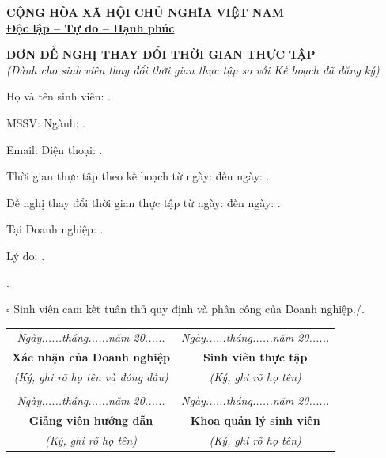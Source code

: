 \documentclass[12pt]{article}
\newcommand{\densedotfill}{\leavevmode\cleaders\hbox{.\hspace{1.5pt}}\hfill\kern0pt}
\begin{document}
\begin{flushright}
\end{flushright}

\vspace{-1.5cm}
\begin{center}
\textbf{CỘNG HÒA XÃ HỘI CHỦ NGHĨA VIỆT NAM}\\
\textbf{\underline{Độc lập – Tự do – Hạnh phúc}}\\
\vspace{0.2cm}
\end{center}

\vspace{1cm}

\begin{center}
\textbf{\Large ĐƠN ĐỀ NGHỊ THAY ĐỔI THỜI GIAN THỰC TẬP}\\
\textit{(Dành cho sinh viên thay đổi thời gian thực tập so với Kế hoạch đã đăng ký)}
\end{center}

\vspace{1cm}

\noindent Họ và tên sinh viên: \densedotfill

\noindent MSSV: \makebox[4cm]{\densedotfill} Ngành: \densedotfill

\noindent Email: \makebox[4cm]{\densedotfill} Điện thoại: \densedotfill

\vspace{0.5cm}

\noindent Thời gian thực tập theo kế hoạch từ ngày: \makebox[3cm]{\densedotfill} đến ngày: \densedotfill

\noindent Đề nghị thay đổi thời gian thực tập từ ngày: \makebox[3cm]{\densedotfill} đến ngày: \densedotfill

\noindent Tại Doanh nghiệp: \densedotfill

\noindent Lý do: \densedotfill

\noindent \densedotfill

\vspace{0.5cm}

\noindent $\square$ Sinh viên cam kết tuân thủ quy định và phân công của Doanh nghiệp./.

\vspace{0.5cm}

\noindent
\begin{tabularx}{\textwidth}{@{}C C@{}}
\textit{Ngày......tháng......năm 20......} & \textit{Ngày......tháng......năm 20......} \\
\textbf{Xác nhận của Doanh nghiệp} & \textbf{Sinh viên thực tập} \\
\textit{(Ký, ghi rõ họ tên và đóng dấu)} & \textit{(Ký, ghi rõ họ tên)} \\
\vspace{2.5cm} & \vspace{2.5cm} \\
\textit{Ngày......tháng......năm 20......} & \textit{Ngày......tháng......năm 20......} \\
\textbf{Giảng viên hướng dẫn} & \textbf{Khoa quản lý sinh viên} \\
\textit{(Ký, ghi rõ họ tên)} & \textit{(Ký, ghi rõ họ tên)} \\
\end{tabularx}
\end{document}
